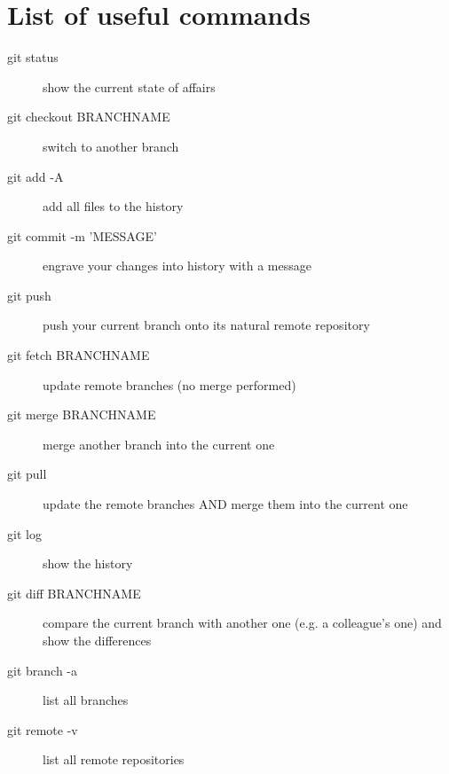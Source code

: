 \documentclass[12pt,a4paper,notitlepage,onecolumn]{article}
\begin{document}
\section{List of useful commands}
\begin{description}
 \item[git status] show the current state of affairs
 \item[git checkout BRANCHNAME] switch to another branch
 \item[git add -A] add all files to the history
 \item[git commit -m 'MESSAGE'] engrave your changes into history with a message
 \item[git push] push your current branch onto its natural remote repository
 \item[git fetch BRANCHNAME] update remote branches (no merge performed)
 \item[git merge BRANCHNAME] merge another branch into the current one
 \item[git pull] update the remote branches AND merge them into the current one
 \item[git log] show the history
 \item[git diff BRANCHNAME] compare the current branch with another one (e.g. a colleague's one) and show the differences
 \item[git branch -a] list all branches
 \item[git remote -v] list all remote repositories
\end{description}
\end{document}
